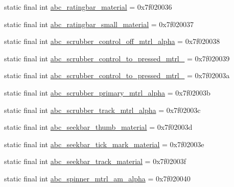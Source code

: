 \begin{CompactItemize}
\item 
static final int \hyperlink{classandroid_1_1support_1_1graphics_1_1drawable_1_1_r_1_1drawable_d3f08882212982f5ca06c2c6a3e671ff}{abc\_\-ratingbar\_\-material} = 0x7f020036
\item 
static final int \hyperlink{classandroid_1_1support_1_1graphics_1_1drawable_1_1_r_1_1drawable_23269b607e62c76c1562d5e1ff859e9d}{abc\_\-ratingbar\_\-small\_\-material} = 0x7f020037
\item 
static final int \hyperlink{classandroid_1_1support_1_1graphics_1_1drawable_1_1_r_1_1drawable_039baf9c574e168e854ae36622c71e8c}{abc\_\-scrubber\_\-control\_\-off\_\-mtrl\_\-alpha} = 0x7f020038
\item 
static final int \hyperlink{classandroid_1_1support_1_1graphics_1_1drawable_1_1_r_1_1drawable_d8ebc1d5b5dc113d76b288ea4206db75}{abc\_\-scrubber\_\-control\_\-to\_\-pressed\_\-mtrl\_} = 0x7f020039
\item 
static final int \hyperlink{classandroid_1_1support_1_1graphics_1_1drawable_1_1_r_1_1drawable_7c8d4ae821393a0596533b5427f96a40}{abc\_\-scrubber\_\-control\_\-to\_\-pressed\_\-mtrl\_} = 0x7f02003a
\item 
static final int \hyperlink{classandroid_1_1support_1_1graphics_1_1drawable_1_1_r_1_1drawable_a4a52b892bfbd20618b7841f260e22a2}{abc\_\-scrubber\_\-primary\_\-mtrl\_\-alpha} = 0x7f02003b
\item 
static final int \hyperlink{classandroid_1_1support_1_1graphics_1_1drawable_1_1_r_1_1drawable_2471b9650367030e85af476ddf5ffc52}{abc\_\-scrubber\_\-track\_\-mtrl\_\-alpha} = 0x7f02003c
\item 
static final int \hyperlink{classandroid_1_1support_1_1graphics_1_1drawable_1_1_r_1_1drawable_6de71989f5d9d91ad7db946d5f5c5dde}{abc\_\-seekbar\_\-thumb\_\-material} = 0x7f02003d
\item 
static final int \hyperlink{classandroid_1_1support_1_1graphics_1_1drawable_1_1_r_1_1drawable_7953a2056a85f17dcec7f59494eeedd5}{abc\_\-seekbar\_\-tick\_\-mark\_\-material} = 0x7f02003e
\item 
static final int \hyperlink{classandroid_1_1support_1_1graphics_1_1drawable_1_1_r_1_1drawable_914fb17ff5f655a19b237c4b452d5f7c}{abc\_\-seekbar\_\-track\_\-material} = 0x7f02003f
\item 
static final int \hyperlink{classandroid_1_1support_1_1graphics_1_1drawable_1_1_r_1_1drawable_6eb9713c778766d2e4eb6e9b40818d34}{abc\_\-spinner\_\-mtrl\_\-am\_\-alpha} = 0x7f020040
\item 

\end{CompactItemize}
